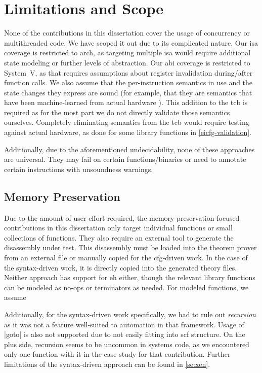 \section{Limitations and Scope}
None of the contributions in this dissertation cover the usage of concurrency or multithreaded code.
We have scoped it out due to its complicated nature.
Our \ac{isa} coverage is restricted to \gls{arch}, as targeting multiple \ac{isa} would require additional state modeling or further levels of abstraction.
Our \ac{abi} coverage is restricted to System~V, as that requires assumptions about register invalidation during/after function calls.
We also assume that the per-instruction semantics in use and the state changes they express are sound (for example, that they are semantics that have been machine-learned from actual hardware \autocite{heule2016stratified,roessle2019formally}).
This addition to the \ac{tcb} is required as for the most part we do not directly validate those semantics ourselves.
Completely eliminating semantics from the \ac{tcb} would require testing against actual hardware, as done for some library functions in \cref{eicfg-validation}.

Additionally, due to the aforementioned undecidability, none of these approaches are universal.
They may fail on certain functions/binaries or need to annotate certain instructions with unsoundness warnings.

\subsection{Memory Preservation}
Due to the amount of user effort required, the memory-preservation-focused contributions in this dissertation only target individual functions or small collections of functions.
They also require an external tool to generate the disassembly under test.
This disassembly must be loaded into the theorem prover from an external file or manually copied for the \ac{cfg}-driven work.
In the case of the syntax-driven work, it is directly copied into the generated theory files.
Neither approach has support for \ac{eh} either, though the relevant library functions can be modeled as no-ops or terminators as needed.
For modeled functions, we assume

Additionally, for the syntax-driven work specifically, we had to rule out \emph{recursion} as it was not a feature well-suited to automation in that framework.
Usage of \inlineasm|goto| is also not supported due to not easily fitting into \ac{scf} structure.
On the plus side, recursion seems to be uncommon in systems code, as we encountered only one function with it in the case study for that contribution.
Further limitations of the syntax-driven approach can be found in \cref{se:xen}.

